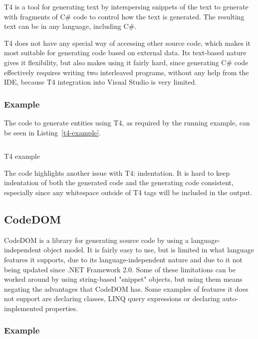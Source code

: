 \ac{T4} \cite{T4} is a tool for generating text by interspersing snippets of the text to generate with fragments of C\# code to control how the text is generated. The resulting text can be in any language, including C\#.

\ac{T4} does not have any special way of accessing other source code, which makes it most suitable for generating code based on external data. Its text-based nature gives it flexibility, but also makes using it fairly hard, since generating C\# code effectively requires writing two interleaved programs, without any help from the \ac{IDE}, because \ac{T4} integration into Visual Studio is very limited.

\subsubsection{Example}

The code to generate entities using \ac{T4}, as required by the running example, can be seen in Listing~\ref{t4-example}.

\begin{listing}
\inputminted{text}{samples/T4/Entities.tt}
\caption{\ac{T4} example}
\label{t4-example}
\end{listing}

The code highlights another issue with \ac{T4}: indentation. It is hard to keep indentation of both the generated code and the generating code consistent, especially since any whitespace outside of \ac{T4} tags will be included in the output.

\subsection{CodeDOM}

\ac{CodeDOM} \cite{codedom} is a library for generating source code by using a language-independent object model. It is fairly easy to use, but is limited in what language features it supports, due to its language-independent nature and due to it not being updated since .NET Framework 2.0. Some of these limitations can be worked around by using string-based "snippet" objects, but using them means negating the advantages that CodeDOM has. Some examples of features it does not support are declaring  classes, LINQ query expressions or declaring auto-implemented properties.

\subsubsection{Example}

